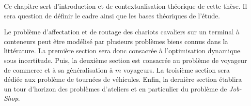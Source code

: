 Ce chapitre sert d'introduction et de contextualisation théorique de cette thèse. Il sera question de définir le cadre ainsi que les bases théoriques de l'étude. 

Le problème d'affectation et de routage des chariots cavaliers sur un terminal à conteneurs peut être modélisé par plusieurs problèmes biens connus dans la littérature. La première section sera donc consacrée à l'optimisation dynamique sous incertitude. Puis, la deuxième section est consacrée au problème de voyageur de commerce et à sa généralisation à $m$ voyageurs. La troisième section sera dédiée aux problème de tournées de véhicules. Enfin, la dernière section établira un tour d'horizon des problèmes d'ateliers et en particulier du problème de \textit{Job-Shop}.
